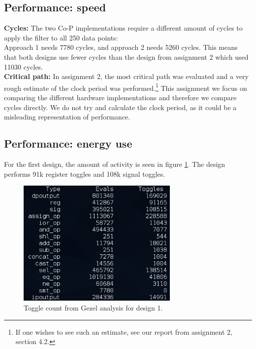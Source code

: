 \subsection{Performance: speed}\label{sec:performanceSpeed}

\textbf{Cycles:} The two Co-P implementations require a different amount of cycles to apply the filter to all 250 data points: \\

Approach 1 needs 7780 cycles, and approach 2 needs 5260 cycles. This means that both designs use fewer cycles than the design from assignment 2 which used 11030 cycles. \\

\textbf{Critical path:} In assignment 2, the most critical path was evaluated and a very rough estimate of the clock period was performed.\footnote{If one wishes to see such an estimate, see our report from assignment 2, section 4.2.} This assignment we focus on comparing the different hardware implementations and therefore we compare cycles directly. We do not try and calculate the clock period, as it could be a misleading representation of performance. 

\subsection{Performance: energy use}\label{sec:performanceEnergy}

For the first design, the amount of activity is seen in figure \ref{fig:ToggleCount1}. The design performs 91k register toggles and 108k signal toggles. 

\begin{figure}[H]
    \centering
    \includegraphics[width=0.7\textwidth]{3Results/fig/Sequential_W_BUS}
    \caption{Toggle count from Gezel analysis for design 1.}
    \label{fig:ToggleCount1}
\end{figure}

